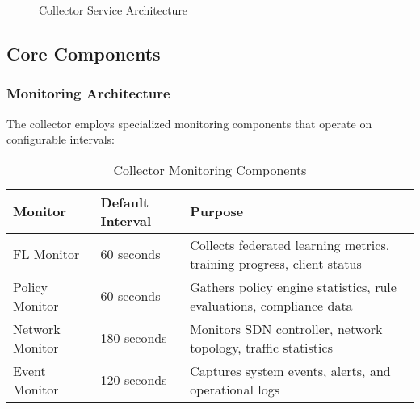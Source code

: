 \begin{figure}[H]
\caption{Collector Service Architecture}
\label{fig:collector-architecture}
\end{figure}

\subsection{Core Components}

\subsubsection{Monitoring Architecture}

The collector employs specialized monitoring components that operate on configurable intervals:

\begin{table}[H]
\centering
\caption{Collector Monitoring Components}
\label{tab:collector-monitors}
\begin{tabular}{@{}llp{6cm}@{}}
\toprule
\textbf{Monitor} & \textbf{Default Interval} & \textbf{Purpose} \\
\midrule
FL Monitor & 60 seconds & Collects federated learning metrics, training progress, client status \\
Policy Monitor & 60 seconds & Gathers policy engine statistics, rule evaluations, compliance data \\
Network Monitor & 180 seconds & Monitors SDN controller, network topology, traffic statistics \\
Event Monitor & 120 seconds & Captures system events, alerts, and operational logs \\
\bottomrule
\end{tabular}
\end{table}

